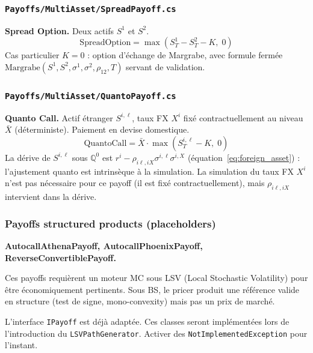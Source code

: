 \documentclass[a4paper,11pt]{article}
\newcommand{\cs}[1]{\texttt{\color{codeinline}#1}}
\begin{document}
\subsubsection{\texttt{Payoffs/MultiAsset/SpreadPayoff.cs}}

\begin{tcolorbox}[math]
\textbf{Spread Option.} Deux actifs $S^1$ et $S^2$.
\[
  \text{SpreadOption} = \max(S^1_T - S^2_T - K,\; 0)
\]
Cas particulier $K = 0$ : option d'\'echange de Margrabe, avec formule ferm\'ee
$\text{Margrabe}(S^1, S^2, \sigma^1, \sigma^2, \rho_{12}, T)$ servant de validation.
\end{tcolorbox}

\subsubsection{\texttt{Payoffs/MultiAsset/QuantoPayoff.cs}}

\begin{tcolorbox}[math]
\textbf{Quanto Call.} Actif \'etranger $S^{i,\ell}$, taux FX $X^i$ fix\'e contractuellement
au niveau $\bar{X}$ (d\'eterministe). Paiement en devise domestique.
\[
  \text{QuantoCall} = \bar{X} \cdot \max(S^{i,\ell}_T - K,\; 0)
\]
La d\'erive de $S^{i,\ell}$ sous $\mathbb{Q}^0$ est $r^i - \rho_{i\ell,iX}\sigma^{i,\ell}\sigma^{i,X}$
(\'equation~\eqref{eq:foreign_asset}) : l'ajustement quanto est intrins\`eque \`a la
simulation. La simulation du taux FX $X^i$ n'est pas n\'ecessaire pour ce payoff
(il est fix\'e contractuellement), mais $\rho_{i\ell,iX}$ intervient dans la d\'erive.
\end{tcolorbox}

\subsubsection{Payoffs structured products (placeholders)}

\begin{tcolorbox}[todo]
\textbf{AutocallAthenaPayoff, AutocallPhoenixPayoff, ReverseConvertiblePayoff.}

Ces payoffs requi\`erent un moteur MC sous LSV (Local Stochastic Volatility) pour
\^etre \'economiquement pertinents. Sous BS, le pricer produit une r\'ef\'erence valide
en structure (test de signe, mono-convexity) mais pas un prix de march\'e.

L'interface \cs{IPayoff} est d\'ej\`a adapt\'ee. Ces classes seront impl\'ement\'ees lors
de l'introduction du \cs{LSVPathGenerator}. Activer des \cs{NotImplementedException}
pour l'instant.
\end{tcolorbox}
\end{document}
